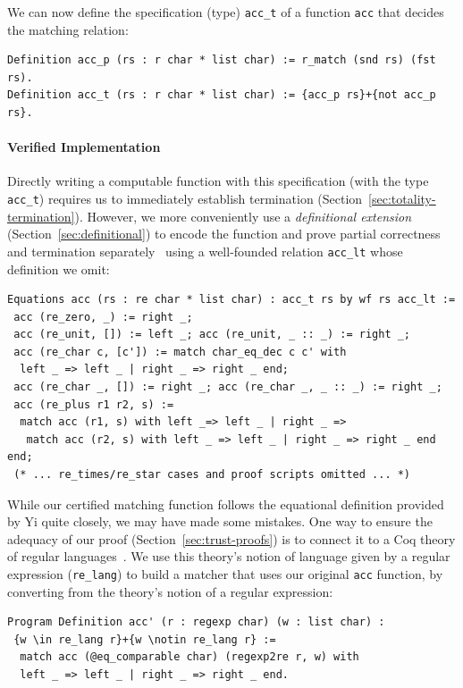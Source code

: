 We can now define the specification (type) \lstinline{acc_t} of a function \lstinline{acc} that decides the matching relation:
\begin{lstlisting}[language=Coq]
Definition acc_p (rs : r char * list char) := r_match (snd rs) (fst rs).
Definition acc_t (rs : r char * list char) := {acc_p rs}+{not acc_p rs}.
\end{lstlisting}

\vspace{-15pt}
\paragraph{Verified Implementation}
Directly writing a computable function with this specification (with the type \lstinline{acc_t}) requires us to immediately establish termination (Section~\ref{sec:totality-termination}). However, we more conveniently use a \emph{definitional extension} (Section~\ref{sec:definitional}) to encode the function and prove partial correctness and termination separately~\citep{Sozeau2010} using a well-founded relation \lstinline{acc_lt} whose definition we omit:
\begin{lstlisting}[language=Coq]
Equations acc (rs : re char * list char) : acc_t rs by wf rs acc_lt :=
 acc (re_zero, _) := right _;
 acc (re_unit, []) := left _; acc (re_unit, _ :: _) := right _;
 acc (re_char c, [c']) := match char_eq_dec c c' with
  left _ => left _ | right _ => right _ end;
 acc (re_char _, []) := right _; acc (re_char _, _ :: _) := right _;
 acc (re_plus r1 r2, s) :=
  match acc (r1, s) with left _=> left _ | right _ =>
   match acc (r2, s) with left _ => left _ | right _ => right _ end end;
 (* ... re_times/re_star cases and proof scripts omitted ... *)
\end{lstlisting}

While our certified matching function follows the equational definition provided by Yi quite closely, we may have made some mistakes. One way to ensure the adequacy of our proof (Section~\ref{sec:trust-proofs}) is to connect it to a Coq theory of regular languages~\citep{Doczkal2018}. We use this theory's notion of language given by a regular expression (\lstinline{re_lang}) to build a matcher that uses our original \lstinline{acc} function, by converting from the theory's notion of a regular expression:
\begin{lstlisting}[language=Coq]
Program Definition acc' (r : regexp char) (w : list char) :
 {w \in re_lang r}+{w \notin re_lang r} :=
  match acc (@eq_comparable char) (regexp2re r, w) with
  left _ => left _ | right _ => right _ end.
\end{lstlisting}

